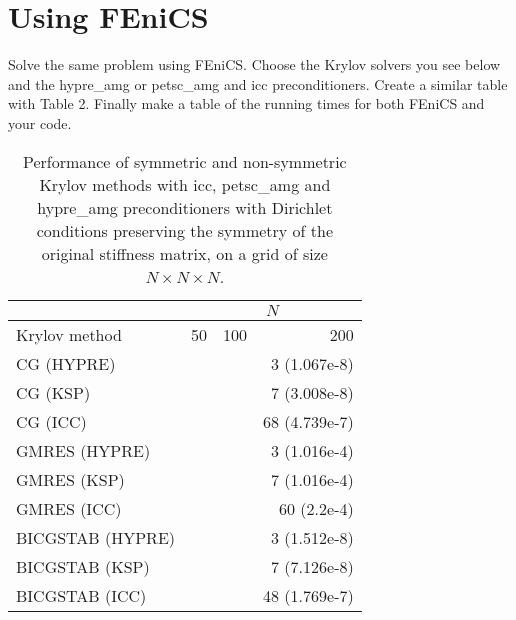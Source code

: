 \documentclass[unicode,11pt,a4paper,oneside,numbers=endperiod,openany]{scrartcl}
\begin{document}
\section*{Using FEniCS}
Solve the same problem using FEniCS. Choose the Krylov solvers you see below and the hypre\_amg
or petsc\_amg and icc preconditioners. Create a similar table with Table 2. Finally make a table
of the running times for both FEniCS and your code.
\begin{table}[h]
\centering
\begin{tabular}{|l|r|r|r|}
\hline
                  &  \multicolumn{3}{|c|}{$N$} \\
\hline
 Krylov method    & 50  & 100 & 200 \\
\hline
CG (HYPRE)        &                     &                     & 3 (1.067e-8)  \\
CG (KSP)          &                     &                     & 7 (3.008e-8)  \\
CG (ICC)          &                     &                     &68 (4.739e-7)  \\
\hline
GMRES (HYPRE)     &                     &                     & 3 (1.016e-4) \\
GMRES (KSP)       &                     &                     & 7 (1.016e-4) \\
GMRES (ICC)       &                     &                     & 60 (2.2e-4) \\
\hline
BICGSTAB (HYPRE)  &                     &                     & 3 (1.512e-8) \\
BICGSTAB (KSP)    &                     &                     & 7 (7.126e-8) \\
BICGSTAB (ICC)    &                     &                     & 48 (1.769e-7) \\
\hline
\end{tabular}
\caption{Performance of symmetric and non-symmetric Krylov methods with icc, petsc\_amg and hypre\_amg  preconditioners with Dirichlet conditions preserving the symmetry of 
         the original stiffness matrix, on a grid of size $N \times N \times N$.}
\end{table}
\end{document}
